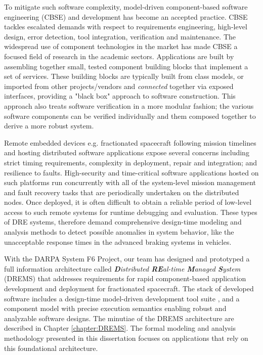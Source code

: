 To mitigate such software complexity, model-driven component-based software engineering (CBSE) and development \cite{beydeda2005model, heineman2001component, clemens1998component} has become an accepted practice. CBSE tackles escalated demands with respect to requirements engineering, high-level design, error detection, tool integration, verification and maintenance. The widespread use of component technologies in the market has made CBSE a focused field of research in the academic sectors. Applications are built by assembling together small, tested component building blocks that implement a set of services. These building blocks are typically built from class models, or imported from other projects/vendors and \emph{connected} together via exposed interfaces, providing a "black box" approach to software construction. This approach also treats software verification in a more modular fashion; the various software components can be verified individually and them composed together to derive a more robust system. 

Remote embedded devices e.g. fractionated spacecraft following mission timelines and hosting distributed software applications expose several concerns including strict timing requirements, complexity in deployment, repair and integration; and resilience to faults. High-security and time-critical software applications hosted on such platforms run concurrently with all of the system-level mission management and fault recovery tasks that are periodically undertaken on the distributed nodes. Once deployed, it is often difficult to obtain a reliable period of low-level access to such remote systems for runtime debugging and evaluation. These types of DRE systems, therefore demand comprehensive design-time modeling and analysis methods to detect possible anomalies in system behavior, like the unacceptable response times in the advanced braking systems in vehicles. 

With the DARPA System F6 Project, our team has designed and prototyped a full information architecture called \emph{\textbf{D}istributed \textbf{RE}al-time \textbf{M}anaged \textbf{S}ystem} (DREMS) \cite{ISIS_F6_Aerospace:12,DREMS13Software} that addresses requirements for rapid component-based application development and deployment for fractionated spacecraft. The stack of developed software includes a  design-time model-driven development tool suite \cite{ISIS_F6_SFFMT:13}, and a component model \cite{ISIS_F6_ISORC:13} with precise execution semantics enabling robust and analyzable software designs. The minutiae of the DREMS architecture are described in Chapter \ref{chapter:DREMS}. The formal modeling and analysis methodology presented in this dissertation focuses on applications that rely on this foundational architecture. 


